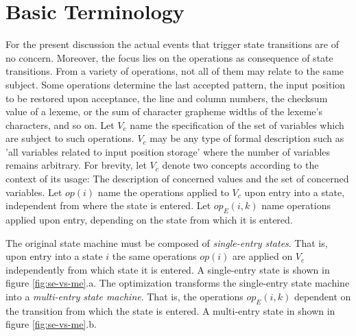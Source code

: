 \documentclass[12pt,a4paper]{scrartcl}
\begin{document}
%
\section{Basic Terminology}

For the present discussion the actual events that trigger state transitions are
of no concern. Moreover, the focus lies on the operations as consequence of
state transitions.  From a variety of operations, not all of them may relate to
the same subject.  Some operations determine the last accepted pattern, the
input position to be restored upon acceptance, the line and column numbers, the
checksum value of a lexeme, or the sum of character grapheme widths of the
lexeme's characters, and so on. Let $V_c$ name the specification of the set of
variables which are subject to such operations. $V_c$ may be any type of formal
description such as 'all variables related to input position storage' where the
number of variables remains arbitrary.  For brevity, let $V_c$ denote two
concepts according to the context of its usage: The description of concerned
values and the set of concerned variables. Let $op(i)$ name the operations
applied to $V_c$ upon entry into a state, independent from where the state is
entered. Let $op_E(i,k)$ name operations applied upon entry, depending on the
state from which it is  entered.

The original state machine must be composed of \textit{single-entry states}.
That is, upon entry into a state $i$ the same operations $op(i)$ are applied on
$V_c$ independently from which state it is entered.  A single-entry state is
shown in figure \ref{fig:se-vs-me}.a. The optimization transforms the
single-entry state machine into a \textit{multi-entry state machine}.  That is,
the operations $op_E(i,k)$ dependent on the transition from which the state is
entered. A multi-entry state in shown in figure \ref{fig:se-vs-me}.b.
\end{document}
